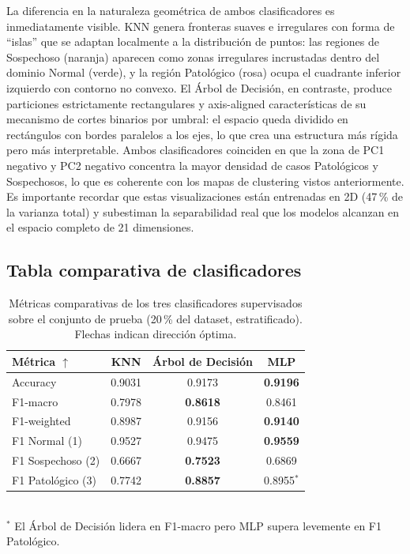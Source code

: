 \documentclass[12pt,letterpaper]{article}
\begin{document}
La diferencia en la naturaleza geométrica de ambos clasificadores es inmediatamente
visible. KNN genera fronteras suaves e irregulares con forma de ``islas'' que se
adaptan localmente a la distribución de puntos: las regiones de Sospechoso (naranja)
aparecen como zonas irregulares incrustadas dentro del dominio Normal (verde), y la
región Patológico (rosa) ocupa el cuadrante inferior izquierdo con contorno no
convexo. El Árbol de Decisión, en contraste, produce particiones estrictamente
rectangulares y axis-aligned características de su mecanismo de cortes binarios por
umbral: el espacio queda dividido en rectángulos con bordes paralelos a los ejes,
lo que crea una estructura más rígida pero más interpretable. Ambos clasificadores
coinciden en que la zona de PC1 negativo y PC2 negativo concentra la mayor densidad
de casos Patológicos y Sospechosos, lo que es coherente con los mapas de clustering
vistos anteriormente. Es importante recordar que estas visualizaciones están
entrenadas en 2D (47\,\% de la varianza total) y subestiman la separabilidad real
que los modelos alcanzan en el espacio completo de 21 dimensiones.
 
\subsection{Tabla comparativa de clasificadores}
 
\begin{table}[H]
\centering
\caption{Métricas comparativas de los tres clasificadores supervisados sobre el conjunto
         de prueba (20\,\% del dataset, estratificado). Flechas indican dirección óptima.}
\label{tab:metricas_clasificacion}
\begin{tabular}{lccc}
\toprule
\rowcolor{headbg}
\textbf{Métrica $\uparrow$} & \textbf{KNN} & \textbf{Árbol de Decisión} & \textbf{MLP} \\
\midrule
Accuracy          & 0.9031          & 0.9173          & \textbf{0.9196} \\
F1-macro          & 0.7978          & \textbf{0.8618} & 0.8461          \\
F1-weighted       & 0.8987          & 0.9156          & \textbf{0.9140} \\
F1 Normal (1)     & 0.9527          & 0.9475          & \textbf{0.9559} \\
F1 Sospechoso (2) & 0.6667          & \textbf{0.7523} & 0.6869          \\
F1 Patológico (3) & 0.7742          & \textbf{0.8857} & 0.8955$^{*}$   \\
\bottomrule
\end{tabular}
\smallskip\\
\footnotesize{$^{*}$ El Árbol de Decisión lidera en F1-macro pero MLP supera levemente en F1 Patológico.}
\end{table}
 
\end{document}
